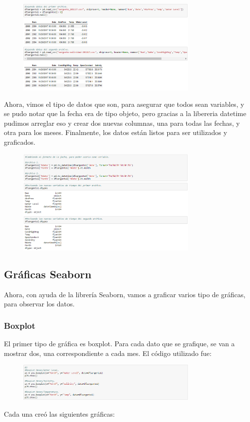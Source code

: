 \documentclass[a4paper]{article}
\begin{document}
\pagebreak
\begin{figure}[h!]
 \centering
  \includegraphics[width=0.8\textwidth]{datos1.PNG}
\end{figure}

Ahora, vimos el tipo de datos que son, para asegurar que todos sean variables, y se pudo notar que la fecha era de tipo objeto, pero gracias a la libereria datetime pudimos arreglar eso y crear dos nuevas columnas, una para todas las fechas, y otra para los meses. Finalmente, los datos están listos para ser utilizados y graficados.  

\begin{figure}[ht!]
 \centering
  \includegraphics[width=0.8\textwidth]{datos2.PNG}
\end{figure}

\pagebreak
\subsection{Gráficas Seaborn}
Ahora, con ayuda de la librería Seaborn, vamos a graficar varios tipo de gráficas, para observar los datos. 
\subsubsection{Boxplot}
El primer tipo de gráfica es boxplot. Para cada dato que se grafique, se van a mostrar dos, una correspondiente a cada mes. El código utilizado fue:
\begin{figure}[h!]
 \centering
  \includegraphics[width=0.8\textwidth]{BoxplotCodigo.PNG}
\end{figure}
Cada una creó las siguientes gráficas:
\end{document}
